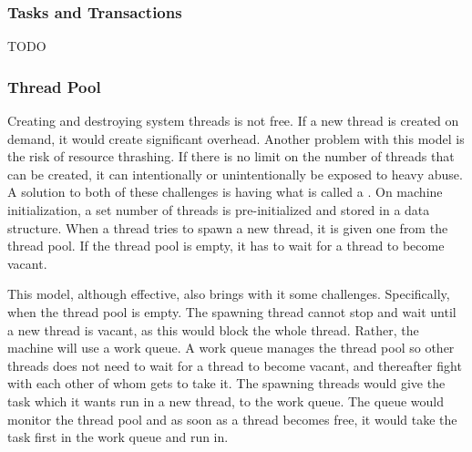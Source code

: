 \subsubsection{Tasks and Transactions}
TODO


\subsubsection{Thread Pool}
Creating and destroying system threads is not free. If a new thread is created
on demand, it would create significant overhead. Another problem with this model
is the risk of resource thrashing. If there is no limit on the number of threads
that can be created, it can intentionally or unintentionally be exposed to heavy
abuse. A solution to both of these challenges is having what is called a
. On machine initialization, a set number of threads is
pre-initialized and stored in a data structure. When a thread tries to spawn a
new thread, it is given one from the thread pool. If the thread pool is empty,
it has to wait for a thread to become vacant.

This model, although effective, also brings with it some
challenges. Specifically, when the thread pool is empty. The spawning thread
cannot stop and wait until a new thread is vacant, as this would block the whole
thread. Rather, the machine will use a work queue. A work queue manages the
thread pool so other threads does not need to wait for a thread to become
vacant, and thereafter fight with each other of whom gets to take it. The
spawning threads would give the task which it wants run in a new thread, to the
work queue. The queue would monitor the thread pool and as soon as a thread
becomes free, it would take the task first in the work queue and run in.

